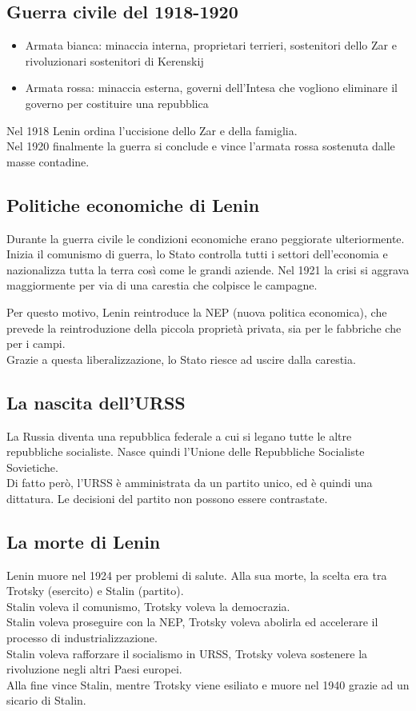 \documentclass{article}
\begin{document}
\subsection{Guerra civile del 1918-1920}

\begin{itemize}
    \item Armata bianca: minaccia interna, proprietari terrieri, sostenitori dello Zar e rivoluzionari sostenitori di Kerenskij
    \item Armata rossa: minaccia esterna, governi dell'Intesa che vogliono eliminare il governo per costituire una repubblica
\end{itemize}

Nel 1918 Lenin ordina l'uccisione dello Zar e della famiglia.\\
Nel 1920 finalmente la guerra si conclude e vince l'armata rossa sostenuta dalle
masse contadine.

\subsection{Politiche economiche di Lenin}
Durante la guerra civile le condizioni economiche erano peggiorate ulteriormente. Inizia
il comunismo di guerra, lo Stato controlla tutti i settori dell'economia e nazionalizza
tutta la terra così come le grandi aziende. Nel 1921 la crisi si aggrava maggiormente
per via di una carestia che colpisce le campagne.

Per questo motivo, Lenin reintroduce la NEP (nuova politica economica), che prevede
la reintroduzione della piccola proprietà privata, sia per le fabbriche che per i campi.\\
Grazie a questa liberalizzazione, lo Stato riesce ad uscire dalla carestia.

\subsection{La nascita dell'URSS}
La Russia diventa una repubblica federale a cui si legano tutte le altre repubbliche
socialiste. Nasce quindi l'Unione delle Repubbliche Socialiste Sovietiche.\\
Di fatto però, l'URSS è amministrata da un partito unico, ed è quindi una dittatura.
Le decisioni del partito non possono essere contrastate.

\subsection{La morte di Lenin}
Lenin muore nel 1924 per problemi di salute. Alla sua morte, la scelta era tra Trotsky
(esercito) e Stalin (partito).\\
Stalin voleva il comunismo, Trotsky voleva la democrazia.\\
Stalin voleva proseguire con la NEP, Trotsky voleva abolirla ed accelerare il processo
di industrializzazione.\\
Stalin voleva rafforzare il socialismo in URSS, Trotsky voleva sostenere la rivoluzione
negli altri Paesi europei.\\
Alla fine vince Stalin, mentre Trotsky viene esiliato e muore nel 1940 grazie ad un 
sicario di Stalin.
\end{document}

